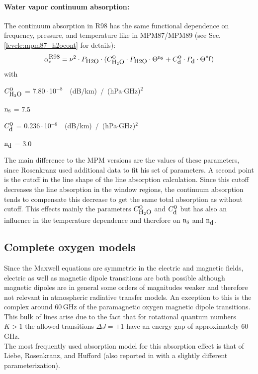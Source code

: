 \paragraph{Water vapor continuum absorption:}
\label{levele:pwr98_h2ocont}
The continuum absorption in R98 has the same functional dependence on frequency,
pressure, and temperature like in MPM87/MPM89 (see Sec. \ref{levele:mpm87_h2ocont}
for details):
\begin{equation} 
  \label{eq:abs_theory:pwr98:abscont}
  \alpha^{\mbox{\rm \small R98}}_{\rm c} = \nu^2 \cdot P_{\mbox{\rm \small H2O}} \cdot 
               (C^{\mbox{\rm o}}_{\mbox{\rm \small H}_{2}\mbox{\rm \small O}} \cdot P_{\mbox{\rm \small H2O}} \cdot \Theta^{{\rm n}_{\mbox{\rm \small s}}} + 
                C^{\mbox{\rm o}}_{\mbox{\rm \small d}} \cdot P_{\mbox{\rm \small d}}  \cdot \Theta^{{\rm n}_{\mbox{\rm \small f}}})
\end{equation}
with
\begin{description}
\item{$C^{\mbox{\rm o}}_{\mbox{\rm \small H}_{2}\mbox{\rm \small O}}$}   = 7.80\,$\cdot$\,10$^{-8}$~~(dB/km)~/~(hPa$\cdot$GHz)$^2$
\item{${\rm n}_{\mbox{\rm \small s}}$}    = 7.5
\item{$C^{\mbox{\rm o}}_{\mbox{\rm \small d}}$}   =  0.236\,$\cdot$\,10$^{-8}$~~(dB/km)~/~(hPa$\cdot$GHz)$^2$
\item{${\rm n}_{\mbox{\rm \small d}}$}    = 3.0
\end{description}
The main difference to the MPM versions are the values of these 
parameters, since Rosenkranz used additional data to fit his set of 
parameters. A second point is the cutoff in the line shape of the line 
absorption calculation. Since this cutoff decreases the line absorption 
in the window regions, the continuum absorption tends to compensate this 
decrease to get the same total absorption as without cutoff. This effects 
mainly the parameters $C^{\mbox{\rm o}}_{\mbox{\rm \small H}_{2}\mbox{\rm \small O}}$ and $C^{\mbox{\rm o}}_{\mbox{\rm \small d}}$ but has also an influence in the 
temperature dependence and therefore on ${\rm n}_{\mbox{\rm \small s}}$ and ${\rm n}_{\mbox{\rm \small d}}$.




\subsection{Complete oxygen models}
\label{levelc:02_models}
%
Since the Maxwell equations are symmetric in the electric and
magnetic fields, electric as well as magnetic dipole transitions 
are both possible although magnetic dipoles are in general some
orders of magnitudes weaker and therefore not relevant in
atmospheric radiative transfer models. An exception to this is the complex 
around 60\,GHz of the paramagnetic oxygen magnetic dipole transitions. 
This bulk of lines arise due to the fact that for rotational 
quantum numbers $K>1$ the allowed transitions \mbox{$\Delta J = \pm$1} 
have an energy gap of approximately 60\,GHz.\\
The most frequently used absorption model for this absorption effect is that of
Liebe, Rosenkranz, and Hufford \citep{liebeetal:92} (also reported in 
\citet{pwr:93} with a slightly different parameterization).

